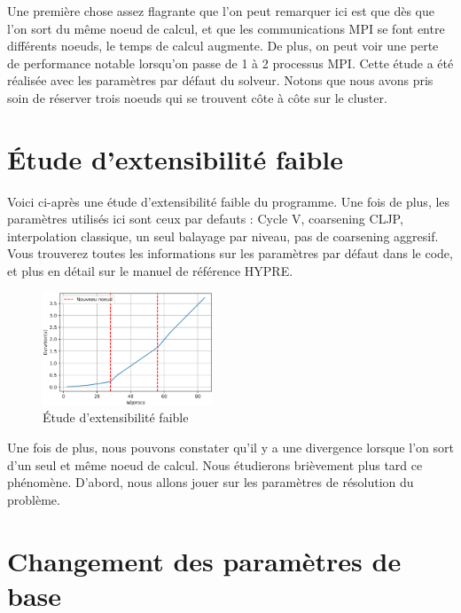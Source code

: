 \documentclass[10pt,twocolumn,letterpaper]{article}
\begin{document}
Une première chose assez flagrante que l'on peut remarquer ici est que dès que
l'on sort du même noeud de calcul, et que les communications MPI se font entre
différents noeuds, le temps de calcul augmente.
De plus, on peut voir une perte de performance notable lorsqu'on passe de 1 à 2
processus MPI. Cette étude a été réalisée avec les paramètres par défaut du
solveur.
Notons que nous avons pris soin de
réserver trois noeuds qui se trouvent côte à côte sur le cluster.

\section{Étude d'extensibilité faible}

Voici ci-après une étude d'extensibilité faible du programme. Une fois de plus,
les paramètres utilisés ici sont ceux par defauts : Cycle V, coarsening CLJP,
interpolation classique, un seul balayage par niveau, pas de coarsening aggresif.
Vous trouverez toutes les informations sur les paramètres par défaut dans le
code, et plus en détail sur le manuel de référence HYPRE.

\begin{figure}[H]
    \centering
    \caption{Étude d'extensibilité faible}
    \includegraphics[width=0.45\textwidth]{fig/weak_scalab.png}
  \end{figure}

Une fois de plus, nous pouvons constater qu'il y a une divergence lorsque l'on
sort d'un seul et même noeud de calcul. Nous étudierons brièvement plus tard
ce phénomène. 
D'abord, nous allons jouer sur les paramètres de résolution du problème.


\section{Changement des paramètres de base}
\end{document}
